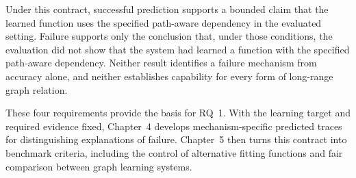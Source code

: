 Under this contract, successful prediction supports a bounded claim that the learned function uses the specified path-aware dependency in the evaluated setting.
Failure supports only the conclusion that, under those conditions, the evaluation did not show that the system had learned a function with the specified path-aware dependency.
Neither result identifies a failure mechanism from accuracy alone, and neither establishes capability for every form of long-range graph relation.

These four requirements provide the basis for RQ~1.
With the learning target and required evidence fixed, Chapter~4 develops mechanism-specific predicted traces for distinguishing explanations of failure.
Chapter~5 then turns this contract into benchmark criteria, including the control of alternative fitting functions and fair comparison between graph learning systems.
